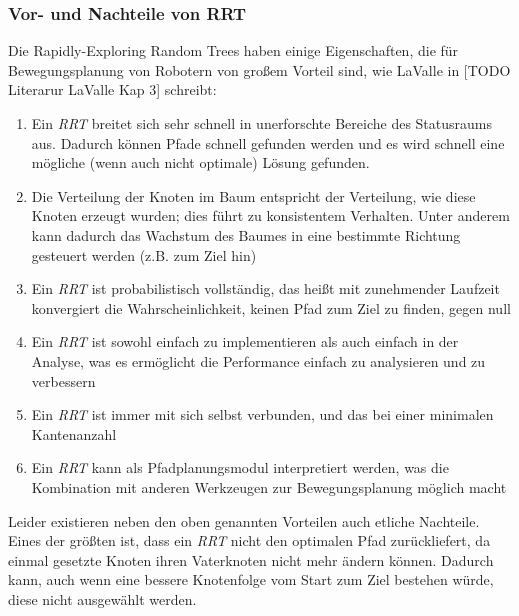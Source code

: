 \subsubsection{Vor- und Nachteile von RRT}
Die Rapidly-Exploring Random Trees haben einige Eigenschaften, die für Bewegungsplanung von Robotern von großem Vorteil sind, wie LaValle in  [TODO Literarur LaValle Kap 3] schreibt:
\begin{enumerate}
\item Ein \textit{RRT} breitet sich sehr schnell in unerforschte Bereiche des Statusraums aus. Dadurch können Pfade schnell gefunden werden und es wird schnell eine mögliche (wenn auch nicht optimale) Lösung gefunden.
\item Die Verteilung der Knoten im Baum entspricht der Verteilung, wie diese Knoten erzeugt wurden; dies führt zu konsistentem Verhalten. Unter anderem kann dadurch das Wachstum des Baumes in eine bestimmte Richtung gesteuert werden (z.B. zum Ziel hin)
\item Ein \textit{RRT} ist probabilistisch vollständig, das heißt mit zunehmender Laufzeit konvergiert die Wahrscheinlichkeit, keinen Pfad zum Ziel zu finden, gegen null
\item Ein \textit{RRT} ist sowohl einfach zu implementieren als auch einfach in der Analyse, was es ermöglicht die Performance einfach zu analysieren und zu verbessern
\item Ein \textit{RRT} ist immer mit sich selbst verbunden, und das bei einer minimalen Kantenanzahl
\item Ein \textit{RRT} kann als Pfadplanungsmodul interpretiert werden, was die Kombination mit anderen Werkzeugen zur Bewegungsplanung möglich macht
\end{enumerate}
Leider existieren neben den oben genannten Vorteilen auch etliche Nachteile. Eines der größten ist, dass ein \textit{RRT} nicht den optimalen Pfad zurückliefert, da einmal gesetzte Knoten ihren Vaterknoten nicht mehr ändern können. Dadurch kann, auch wenn eine bessere Knotenfolge vom Start zum Ziel bestehen würde, diese nicht ausgewählt werden. \\
